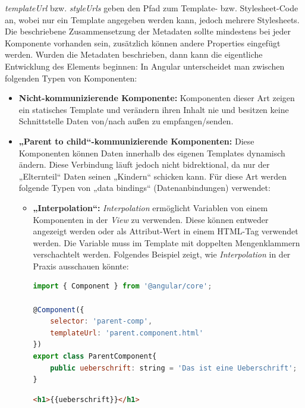 \textit{templateUrl} bzw. \textit{styleUrls} geben den Pfad zum Template- bzw. Stylesheet-Code an, wobei nur ein Template angegeben werden kann, jedoch mehrere Stylesheets. Die beschriebene Zusammensetzung der Metadaten sollte mindestens bei jeder Komponente vorhanden sein, zusätzlich können andere Properties eingefügt werden.
\clearpage
Wurden die Metadaten beschrieben, dann kann die eigentliche Entwicklung des Elements beginnen: In Angular unterscheidet man zwischen folgenden Typen von Komponenten:
\cite{angular_communication}
\begin{itemize}
    \item \textbf{Nicht-kommunizierende Komponente:} Komponenten dieser Art zeigen ein statisches Template und verändern ihren Inhalt nie und besitzen keine Schnittstelle Daten von/nach außen zu empfangen/senden.
    \item \textbf{„Parent to child“-kommunizierende Komponenten:}  Diese Komponenten können Daten innerhalb des eigenen Templates dynamisch ändern. Diese Verbindung läuft jedoch nicht bidrektional, da nur der „Elternteil“ Daten seinen „Kindern“ schicken kann.
    Für diese Art werden folgende Typen von „data bindings“ (Datenanbindungen) verwendet:
    \begin{itemize}
        \item \textbf{„Interpolation“:} \textit{Interpolation} ermöglicht Variablen von einem Komponenten in der \textit{View} zu verwenden. Diese können entweder angezeigt werden oder als Attribut-Wert in einem HTML-Tag verwendet werden. Die Variable muss im Template mit doppelten Mengenklammern verschachtelt werden. Folgendes Beispiel zeigt, wie \textit{Interpolation} in der Praxis ausschauen könnte:
        
\lstset{escapechar=?,style=customjava}
\begin{lstlisting}[language=javascript, caption=Beispiel von \textit{Interpolation} (\textit{parent.component.ts} - Datei), captionpos=t]
import { Component } from '@angular/core';

@Component({
	selector: 'parent-comp',
	templateUrl: 'parent.component.html'
})
export class ParentComponent{
    public ueberschrift: string = 'Das ist eine Ueberschrift';
}
\end{lstlisting}
\lstset{escapechar=@,style=customjava}

\lstset{escapechar=?,style=customjava}
\begin{lstlisting}[language=html, caption=Beispiel von \textit{Interpolation} (\textit{parent.component.html} - Datei), captionpos=t]
<h1>{{ueberschrift}}</h1>
\end{lstlisting}
\lstset{escapechar=@,style=customjava}


\end{itemize}
\end{itemize}
